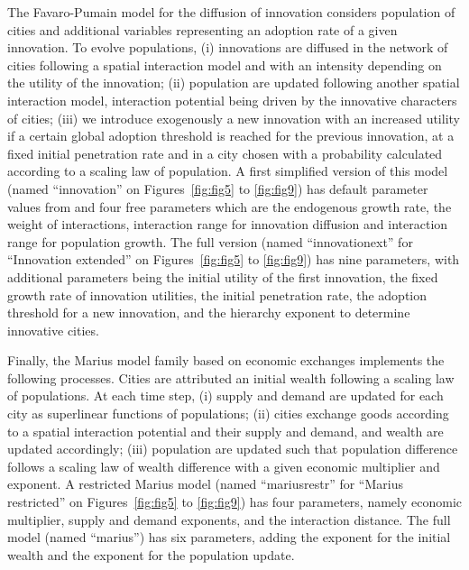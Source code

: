 \documentclass[11pt]{article}
\begin{document}
The Favaro-Pumain model for the diffusion of innovation \cite{favaro2011gibrat} considers population of cities and additional variables representing an adoption rate of a given innovation. To evolve populations, (i) innovations are diffused in the network of cities following a spatial interaction model and with an intensity depending on the utility of the innovation; (ii) population are updated following another spatial interaction model, interaction potential being driven by the innovative characters of cities; (iii) we introduce exogenously a new innovation with an increased utility if a certain global adoption threshold is reached for the previous innovation, at a fixed initial penetration rate and in a city chosen with a probability calculated according to a scaling law of population. A first simplified version of this model (named ``innovation'' on Figures~\ref{fig:fig5} to \ref{fig:fig9}) has default parameter values from \cite{favaro2011gibrat} and four free parameters which are the endogenous growth rate, the weight of interactions, interaction range for innovation diffusion and interaction range for population growth. The full version (named ``innovationext'' for ``Innovation extended'' on Figures~\ref{fig:fig5} to \ref{fig:fig9}) has nine parameters, with additional parameters being the initial utility of the first innovation, the fixed growth rate of innovation utilities, the initial penetration rate, the adoption threshold for a new innovation, and the hierarchy exponent to determine innovative cities.

Finally, the Marius model family based on economic exchanges \cite{cottineau2014evolution} implements the following processes. Cities are attributed an initial wealth following a scaling law of populations. At each time step, (i) supply and demand are updated for each city as superlinear functions of populations; (ii) cities exchange goods according to a spatial interaction potential and their supply and demand, and wealth are updated accordingly; (iii) population are updated such that population difference follows a scaling law of wealth difference with a given economic multiplier and exponent. A restricted Marius model (named ``mariusrestr'' for ``Marius restricted'' on Figures~\ref{fig:fig5} to \ref{fig:fig9}) has four parameters, namely economic multiplier, supply and demand exponents, and the interaction distance. The full model (named ``marius'') has six parameters, adding the exponent for the initial wealth and the exponent for the population update.
\end{document}
